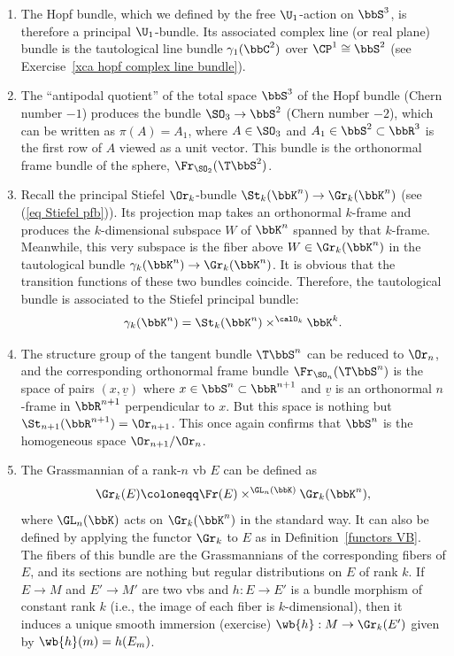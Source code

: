 \begin{example}
\begin{enumerate}
        \item The Hopf bundle, which we defined by the free $\U_1$-action on $\bbS^3$, is therefore a principal $\U_1$-bundle. Its associated complex line (or real plane) bundle is the tautological line bundle $\gamma_1(\bbC^2)$ over $\CP^1\cong\bbS^2$ (see Exercise~\ref{xca hopf complex line bundle}).
        
        \item The ``antipodal quotient'' of the total space $\bbS^3$ of the Hopf bundle (Chern number $-1$) produces the bundle $\SO_3\to \bbS^2$ (Chern number $-2$), which can be written as $\pi(A)=A_1$, where $A\in\SO_3$ and $A_1\in \bbS^2\subset \bbR^3$ is the first row of $A$ viewed as a unit vector. This bundle is the orthonormal frame bundle of the sphere, $\Fr_{\SO_2}(\T\bbS^2)$.
        
        \item Recall the principal Stiefel $\Or_k$-bundle $\St_k(\bbK^n)\to \Gr_k(\bbK^n)$ (see (\ref{eq Stiefel pfb})). Its projection map takes an orthonormal $k$-frame and produces the $k$-dimensional subspace $W$ of $\bbK^n$ spanned by that $k$-frame. Meanwhile, this very subspace is the fiber above $W\in \Gr_k(\bbK^n)$ in the tautological bundle $\gamma_k(\bbK^n)\to \Gr_k(\bbK^n)$. It is obvious that the transition functions of these two bundles coincide. Therefore, the tautological bundle is associated to the Stiefel principal bundle:
        \[\gamma_k(\bbK^n)=\St_k(\bbK^n)\times^{\calO_k}\bbK^k.\]

        \item The structure group of the tangent bundle $\T\bbS^n$ can be reduced to $\Or_n$, and the corresponding orthonormal frame bundle $\Fr_{\SO_n}(\T\bbS^n)$ is the space of pairs $(x,\underline{v})$ where $x\in\bbS^n\subset\bbR^{n+1}$ and $\underline{v}$ is an orthonormal $n$-frame in $\bbR^{n+1}$ perpendicular to $x$. But this space is nothing but $\St_{n+1}(\bbR^{n+1})=\Or_{n+1}$. This once again confirms that $\bbS^n$ is the homogeneous space $\Or_{n+1}\slash \Or_n$.

        \item The Grassmannian of a rank-$n$ \gls{vb} $E$ can be defined as 
        \[\Gr_k(E)\coloneqq \Fr(E)\times^{\GL_n(\bbK)} \Gr_k(\bbK^n),\]
        where $\GL_n(\bbK)$ acts on $\Gr_k(\bbK^n)$ in the standard way. It can also be defined by applying the functor $\Gr_k$ to $E$ as in Definition~\ref{functors VB}. The fibers of this bundle are the Grassmannians of the corresponding fibers of $E$, and its sections are nothing but regular distributions on $E$ of rank $k$.  If $E\to M$ and $E'\to M'$ are two \glspl{vb} and $h:E\to E'$ is a bundle morphism of constant rank $k$ (i.e., the image of each fiber is $k$-dimensional), then it induces a unique smooth immersion (exercise) $\wb{h}:M\to \Gr_k(E')$ given by $\wb{h}(m)=h(E_m)$.
        

\end{enumerate}
\end{example}
